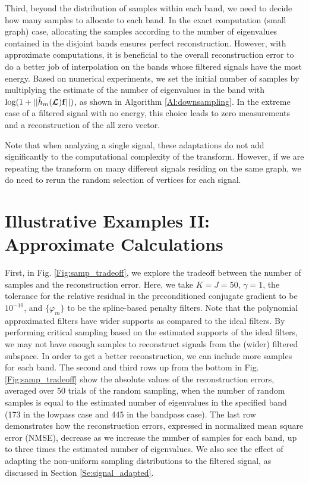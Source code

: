 \documentclass[journal, 10pt]{IEEEtran}
\begin{document}
Third, beyond the distribution of samples within each band, we need to decide how many samples to allocate to each band. In the exact computation (small graph) case, allocating the samples according to the number of eigenvalues contained in the disjoint bands ensures perfect reconstruction. However, with approximate computations, it is beneficial to the overall reconstruction error to do a better job of interpolation on the bands whose filtered signals have the most energy. Based on numerical experiments, we set the initial number of samples by multiplying the estimate of the number of eigenvalues in the band with $\log(1+||\tilde{h}_m(\boldsymbol{\mathcal{L}}){\bf f}||)$, as shown in Algorithm \ref{Al:downsampling}. In the extreme case of a filtered signal with no energy, this choice leads to zero measurements and a reconstruction of the all zero vector.

Note that when analyzing a single signal, these adaptations do not add significantly to the computational complexity of the transform. However, if we are repeating the transform on many different signals residing on the same graph, we do need to rerun the random selection of vertices for each signal.





\section{Illustrative Examples II: Approximate Calculations} \label{Se:ill2}

First, in Fig. \ref{Fig:samp_tradeoff}, we explore the tradeoff between the number of samples and the reconstruction error.  Here, we take $K=J=50$, $\gamma=1$, the tolerance for the relative residual in the preconditioned conjugate gradient to be $10^{-10}$, and $\{\varphi_m\}$ to be the spline-based penalty filters.  Note that the polynomial approximated filters have wider supports as compared to the ideal filters. By performing critical sampling based on the estimated supports of the ideal filters, we may not have enough samples to reconstruct signals from the (wider) filtered subspace. %
In order to get a better reconstruction, we can include more samples for each band. The second and third rows up from the bottom in Fig. \ref{Fig:samp_tradeoff} show the absolute values of the reconstruction errors, averaged over 50 trials of the random sampling, when the number of random samples is equal to the estimated number of eigenvalues in the specified band (173 in the lowpass case and 445 in the bandpass case). The last row demonstrates how the 
reconstruction errors, expressed in normalized mean square error (NMSE), decrease as we increase the number of samples for each band, up to three times the estimated number of eigenvalues. We also see the effect of adapting the non-uniform sampling distributions to the filtered signal, as discussed in Section \ref{Se:signal_adapted}. %
\end{document}
